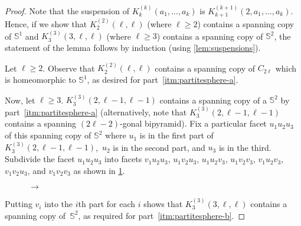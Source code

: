 \documentclass[12pt,reqno]{amsart}
\theoremstyle{plain}
\theoremstyle{definition}
\numberwithin{equation}{section}
\renewcommand{\geq}{\geqslant}
\newcommand{\bS}{\mathbb{S}}
\begin{document}
	\begin{proof}
		Note that the suspension of $K_k^{(k)}(a_1, \dotsc, a_k)$ is $K_{k + 1}^{(k + 1)}(2, a_1, \dotsc, a_k)$. Hence, if we show that $K_2^{(2)}(\ell, \ell)$ (where $\ell \geq 2$) contains a spanning copy of $\bS^1$ and $K_3^{(3)}(3, \ell, \ell)$ (where $\ell \geq 3$) contains a spanning copy of $\bS^2$, the statement of the lemma follows by induction (using \cref{lem:suspensions}).
		
		Let $\ell \geq 2$. Observe that $K_2^{(2)}(\ell, \ell)$ contains a spanning copy of $C_{2 \ell}$ which is homeomorphic to $\bS^1$, as desired for part~\ref{itm:partitesphere-a}.
		
		Now, let $\ell \geq 3$. $K_3^{(3)}(2, \ell - 1, \ell - 1)$ contains a spanning copy of a $\bS^2$ by part~\ref{itm:partitesphere-a} (alternatively, note that $K_3^{(3)}(2, \ell - 1, \ell - 1)$ contains a spanning $(2\ell - 2)$-gonal bipyramid). Fix a particular facet $u_1 u_2 u_3$ of this spanning copy of $\bS^2$ where $u_1$ is in the first part of $K_3^{(3)}(2, \ell - 1, \ell - 1)$,~$u_2$ is in the second part, and $u_3$ is in the third. Subdivide the facet $u_1 u_2 u_3$ into facets $v_1 u_2 u_3$, $u_1 v_2 u_3$, $u_1 u_2 v_3$, $u_1 v_2 v_3$, $v_1 u_2 v_3$, $v_1 v_2 u_3$, and $v_1 v_2 v_3$ as shown in \cref{fig:triangulation}.
		
		\begin{figure}[H]
			\centering
			\begin{subfigure}[m]{0.3\textwidth}
				\centering
			\end{subfigure}$\rightarrow$
			\begin{subfigure}[m]{0.3\textwidth}
				\centering
			\end{subfigure}
			\caption{}\label{fig:triangulation}
		\end{figure}
		
		Putting $v_i$ into the $i$th part for each $i$ shows that $K_3^{(3)}(3, \ell, \ell)$ contains a spanning copy of~$\bS^2$, as required for part~\ref{itm:partitesphere-b}.
	\end{proof}
	
\end{document}
